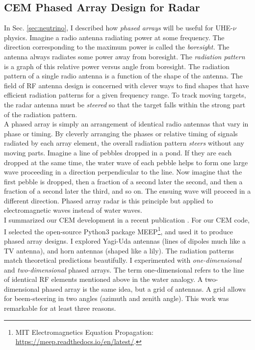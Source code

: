 \documentclass[../../../main.tex]{subfiles}
\begin{document}
\subsection{CEM Phased Array Design for Radar}
\label{sec:phased_array}

In Sec. \ref{sec:neutrino}, I described how \textit{phased arrays} will be useful for UHE-$\nu$ physics.  Imagine a radio antenna radiating power at some frequency.  The direction corresponding to the maximum power is called the \textit{boresight.}  The antenna always radiates some power away from boresight.  The \textit{radiation pattern} is a graph of this relative power versus angle from boresight.  The radiation pattern of a single radio antenna is a function of the shape of the antenna.  The field of RF antenna design is concerned with clever ways to find shapes that have efficient radiation patterns for a given frequency range.  To track moving targets, the radar antenna must be \textit{steered} so that the target falls within the strong part of the radiation pattern.
\\
\vspace{0.25cm}
A phased array is simply an arrangement of identical radio antennas that vary in phase or timing.  By cleverly arranging the phases or relative timing of signals radiated by each array element, the overall radiation pattern \textit{steers} without any moving parts.  Imagine a line of pebbles dropped in a pond.  If they are each dropped at the same time, the water wave of each pebble helps to form one large wave proceeding in a direction perpendicular to the line.  Now imagine that the first pebble is dropped, then a fraction of a second later the second, and then a fraction of a second later the third, and so on.  The ensuing wave will proceed in a different direction.  Phased array radar is this principle but applied to electromagnetic waves instead of water waves.
\\
\vspace{0.25cm}
I summarized our CEM development in a recent publication \cite{electronics10040415}.  For our CEM code, I selected the open-source Python3 package MEEP\footnote{MIT Electromagnetics Equation Propagation: \url{https://meep.readthedocs.io/en/latest/}.}, and used it to produce phased array designs.  I explored Yagi-Uda antennas (lines of dipoles much like a TV antenna), and horn antennas (shaped like a lily).  The radiation patterns match theoretical predictions beautifully.  I experimented with \textit{one-dimensional} and \textit{two-dimensional} phased arrays.  The term one-dimensional refers to the line of identical RF elements mentioned above in the water analogy.  A two-dimensional phased array is the same idea, but a grid of antennas.  A grid allows for beem-steering in two angles (azimuth and zenith angle).  This work was remarkable for at least three reasons.
\end{document}

